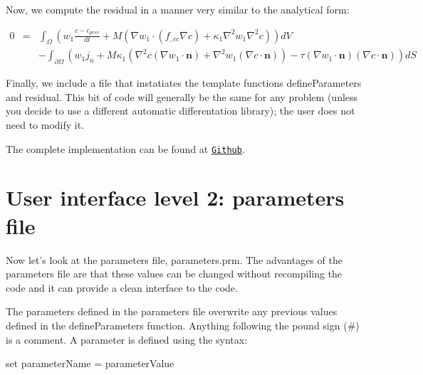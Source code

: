 Now, we compute the residual in a manner very similar to the analytical form\-:

\begin{eqnarray*} 0 &=& \int_\Omega \left(w_1\frac{c - c_{prev}}{\mathrm{d}t} + M\left(\nabla w_1\cdot(f_{,cc}\nabla c) + \kappa_1\nabla^2 w_1\nabla^2 c\right)\right) dV\\ &\phantom{=}& - \int_{\partial\Omega} \left(w_1j_n + M\kappa_1\left(\nabla^2c(\nabla w_1\cdot\boldsymbol{n}) + \nabla^2w_1(\nabla c\cdot\boldsymbol{n})\right) - \tau(\nabla w_1\cdot\boldsymbol{n})(\nabla c\cdot\boldsymbol{n})\right) dS \end{eqnarray*}


\begin{DoxyCodeInclude}

\end{DoxyCodeInclude}


Finally, we include a file that instatiates the template functions {\ttfamily define\-Parameters} and {\ttfamily residual}. This bit of code will generally be the same for any problem (unless you decide to use a different automatic differentation library); the user does not need to modify it.


\begin{DoxyCodeInclude}

\end{DoxyCodeInclude}


The complete implementation can be found at \href{https://github.com/mechanoChem/mechanoChemIGA/blob/master/initBounValProbs/CahnHilliard_oneSpecies/2D/userFunctions.cc}{\tt Github}.

\section*{User interface level 2\-: parameters file }

Now let's look at the parameters file, {\ttfamily parameters.\-prm}. The advantages of the parameters file are that these values can be changed without recompiling the code and it can provide a clean interface to the code. 

The parameters defined in the parameters file overwrite any previous values defined in the {\ttfamily define\-Parameters} function. Anything following the pound sign (\#) is a comment. A parameter is defined using the syntax\-:

{\ttfamily set} {\ttfamily parameter\-Name} {\ttfamily =} {\ttfamily parameter\-Value} 

